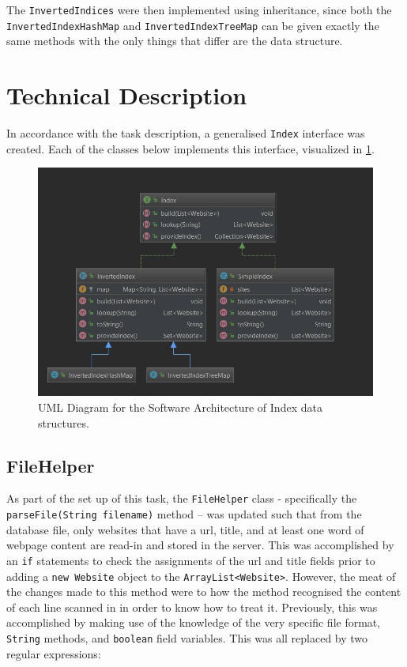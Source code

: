 The {\tt InvertedIndices} were then implemented using inheritance, since both the {\tt InvertedIndexHashMap} and {\tt InvertedIndexTreeMap} can be given exactly the same methods with the only things that differ are the data structure.

\newpage

\section{Technical Description}
In accordance with the task description, a generalised {\tt Index} interface was created. Each of the classes below implements this interface, visualized in \ref{fig:Index:uml}.

\begin{figure}[H]
    \centering
    \includegraphics[width=\textwidth]{figures/Diagram_InvertedIndices}
    \caption{UML Diagram for the Software Architecture of Index data structures.}
    \label{fig:Index:uml}
\end{figure}

\subsection{FileHelper}
As part of the set up of this task, the {\tt FileHelper} class - specifically the \\ {\tt parseFile(String filename)} method – was updated such that from the database file, only websites that have a url, title, and at least one word of webpage content are read-in and stored in the server.
This was accomplished by an {\tt if} statements to check the assignments of the url and title fields prior to adding a {\tt new Website} object to the {\tt ArrayList<Website>}. However, the meat of the changes made to this method were to how the method recognised the content of each line scanned in in order to know how to treat it.
Previously, this was accomplished by making use of the knowledge of the very specific file format, {\tt String} methods, and {\tt boolean} field variables.
This was all replaced by two regular expressions:

